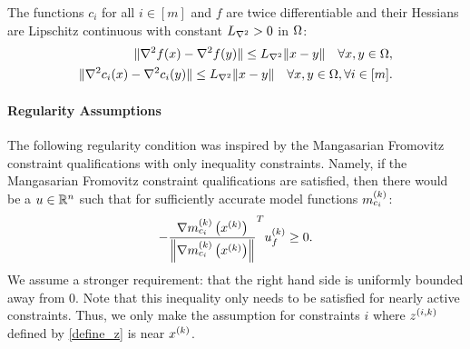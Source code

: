 

\begin{assumption}
\label{lipschitz_hessians_assumption}
The functions $c_i$ for all $i \in [m]$ and $f$ are twice differentiable and their Hessians are Lipschitz continuous with constant ${L_{\nabla^2}} > 0$ in $ \Omega $:
\begin{align*}
\|\nabla^2 f(x) - \nabla^2 f(y)\| \le {L_{\nabla^2}} \|x - y\| \quad \forall x,y \in \Omega, \\
\|\nabla^2 c_i(x) - \nabla^2 c_i(y)\| \le {L_{\nabla^2}} \|x - y\| \quad \forall x,y \in \Omega, \forall i \in [m] .
\end{align*}
\end{assumption}


\paragraph*{Regularity Assumptions}


The following regularity condition was inspired by the Mangasarian Fromovitz constraint qualifications with only inequality constraints.
Namely, if the Mangasarian Fromovitz constraint qualifications are satisfied, then there would be a $u\in\mathbb R^n$ 
such that for sufficiently accurate model functions ${{m}^{(k)}_{c_i}}$:
\begin{align*}
-\frac {{\nabla m_{c_i}^{(k)}\left(x^{(k)}\right)}}{\left\|{\nabla m_{c_i}^{(k)}\left(x^{(k)}\right)}\right\|} ^T{u^{(k)}_f} \ge 0.
\end{align*}
We assume a stronger requirement: that the right hand side is uniformly bounded away from $0$.
Note that this inequality only needs to be satisfied for nearly active constraints.
Thus, we only make the assumption for constraints $i$ where ${z^{(i, k)}}$ defined by \cref{define_z} is near $x^{(k)}$.
% 

